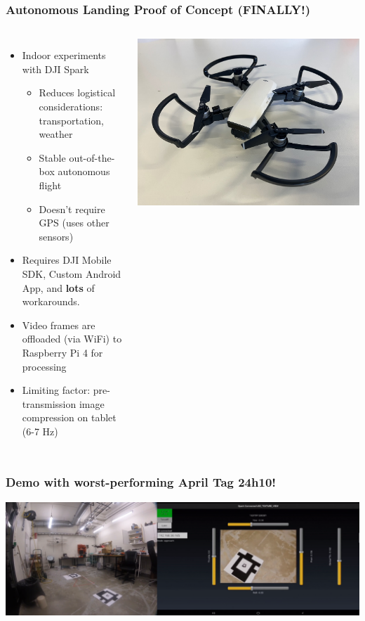 \documentclass[aspectratio=169]{rubeamer}
\newif\ifpause
\newcommand{\mypause}{\ifpause \pause \fi}
\begin{document}
\begin{frame}
  \frametitle{Autonomous Landing Proof of Concept \textbf{(FINALLY!)}}
  \begin{columns}
      \begin{itemize}
        \item Indoor experiments with DJI Spark
        \mypause
        \begin{itemize}
          \item Reduces logistical considerations:\\transportation, weather
          \mypause
          \item Stable out-of-the-box autonomous flight
          \mypause
          \item Doesn't require GPS (uses other sensors)
        \end{itemize}
        \mypause
        \item Requires DJI Mobile SDK, Custom Android App, and \textbf{lots} of workarounds.
        \mypause
        \item Video frames are offloaded (via WiFi) to Raspberry Pi 4 for processing
        \mypause
        \item Limiting factor: pre-transmission image compression on tablet (6-7 Hz)
      \end{itemize}
    \centering
    \onslide
    \includegraphics[width=\textwidth]{dji_spark}
  \end{columns}
\end{frame}

\begin{frame}
  \frametitle{Demo with worst-performing April Tag 24h10!}
  \includegraphics[width=\textwidth]{demo_screenshot}
\end{frame}
\end{document}
